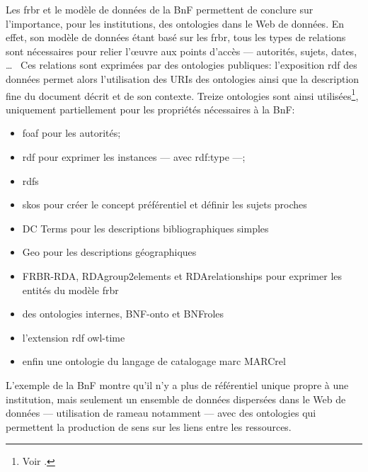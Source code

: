 \bigskip
\bigskip
\bigskip
Les \ac{frbr} et le modèle de données de la BnF permettent de conclure sur l'importance, pour les institutions, des ontologies dans le Web de données. En effet, son modèle de données étant basé sur les \ac{frbr}, tous les types de relations sont nécessaires pour relier l'œuvre aux points d'accès --- autorités, sujets, dates, \dots~ Ces relations sont exprimées par des ontologies publiques: l'exposition \ac{rdf} des données permet alors l'utilisation des URIs des ontologies ainsi que la description fine du document décrit et de son contexte. Treize ontologies sont ainsi utilisées\footnote{Voir .}, uniquement partiellement pour les propriétés nécessaires à la BnF:
\begin{itemize}
	\item {}\ac{foaf} pour les autorités;
	\item {}\ac{rdf} pour exprimer les instances --- avec rdf:type ---;
	\item {}\ac{rdfs}
	\item {}\ac{skos} pour créer le concept préférentiel et définir les sujets proches 
	\item {}DC Terms pour les descriptions bibliographiques simples
	\item Geo pour les descriptions géographiques
	\item {}FRBR-RDA, RDAgroup2elements et RDArelationships pour exprimer les entités du modèle \ac{frbr}
	\item des ontologies internes, BNF-onto et BNFroles
	\item l'extension \ac{rdf} \ac{owl}-time
	\item enfin une ontologie du langage de catalogage \ac{marc} MARCrel
\end{itemize}

L'exemple de la BnF montre qu'il n'y a plus de référentiel unique propre à une institution, mais seulement un ensemble de données dispersées dans le Web de données --- utilisation de \ac{rameau} notamment --- avec des ontologies qui permettent la production de sens sur les liens entre les ressources.\\

